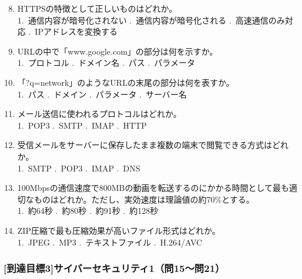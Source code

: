 \documentclass[b4paper,7pt,twocolumn,landscape]{jsarticle}
\begin{document}
\begin{enumerate}
\setcounter{enumi}{7}
\item HTTPSの特徴として正しいものはどれか。\\
1.~通信内容が暗号化されない .~通信内容が暗号化される .~高速通信のみ対応 .~IPアドレスを変換する

\item URLの中で「www.google.com」の部分は何を示すか。\\
1.~プロトコル .~ドメイン名 .~パス .~パラメータ

\item 「?q=network」のようなURLの末尾の部分は何を表すか。\\
1.~パス .~ドメイン .~パラメータ .~サーバー名

\item メール送信に使われるプロトコルはどれか。\\
1.~POP3 .~SMTP .~IMAP .~HTTP

\item 受信メールをサーバーに保存したまま複数の端末で閲覧できる方式はどれか。\\
1.~SMTP .~POP3 .~IMAP .~DNS

\item 100Mbpsの通信速度で800MBの動画を転送するのにかかる時間として最も適切なものはどれか。ただし、実効速度は理論値の約70\%とする。\\
1.~約64秒 .~約80秒 .~約91秒 .~約128秒

\item ZIP圧縮で最も圧縮効果が高いファイル形式はどれか。\\
1.~JPEG .~MP3 .~テキストファイル .~H.264/AVC
\end{enumerate}



\subsubsection*{[到達目標3]サイバーセキュリティ1（問15〜問21）}
\end{document}
